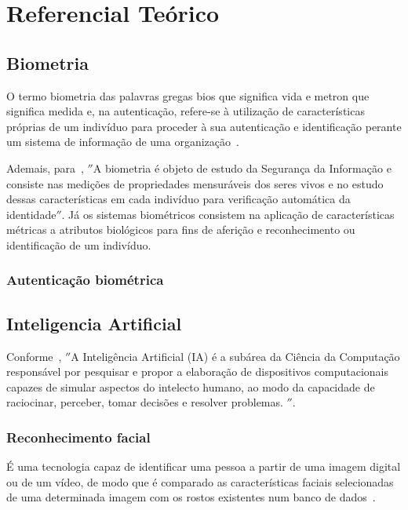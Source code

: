 

\chapter{Referencial Teórico}\label{ch:referencial_teorico}


\section{Biometria}\label{sec:aplicacoes-moveis}
O termo biometria das palavras gregas bios que significa vida e metron que significa medida e, na autenticação, refere-se à utilização de características próprias de um indivíduo para proceder à sua
autenticação e identificação perante um sistema de informação de uma organização~\cite{magalhaes2003biometria}.

Ademais, para~, \(''\)A biometria é objeto de estudo da Segurança da Informação e consiste nas medições de propriedades mensuráveis dos seres vivos e no estudo
dessas características em cada indivíduo para verificação automática da
identidade\(''\).
Já os sistemas biométricos consistem na aplicação de
características métricas a atributos biológicos para fins de aferição e
reconhecimento ou identificação de um indivíduo.

\subsection{Autenticação biométrica}\label{subsec:autenticao-biometrica}


\section{Inteligencia Artificial}\label{sec:ia}
Conforme~, \(''\)A Inteligência Artificial (IA) é a subárea da Ciência da Computação responsável por pesquisar e propor a elaboração de dispositivos computacionais capazes de simular
aspectos do intelecto humano, ao modo da capacidade de raciocinar, perceber, tomar decisões
e resolver problemas. \(''\).

\subsection{Reconhecimento facial}\label{subsec:reconhecimento-facial}
É uma tecnologia capaz de identificar uma pessoa a partir de uma imagem digital ou de um vídeo, de modo que é comparado as características faciais selecionadas de uma determinada imagem com os rostos existentes num banco de dados~\cite{orvalho2019reconhecimento}.

